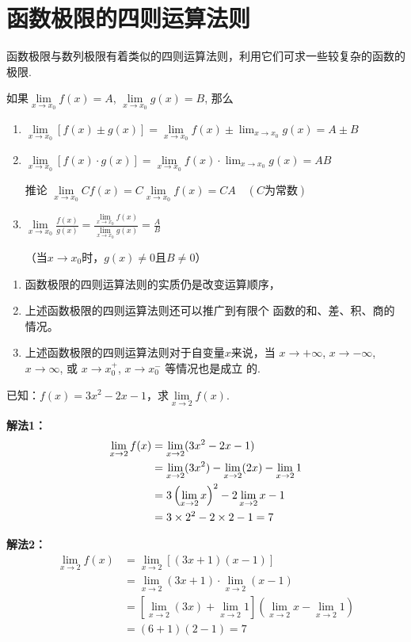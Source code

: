 \section{函数极限的四则运算法则}
函数极限与数列极限有着类似的四则运算法则，利用它们可求一些较复杂的函数的极限.

如果$\lim\limits_{x\to x_{0}}f(x)=A$, $\lim\limits_{x\to x_{0}}g(x)=B$, 那么
\begin{enumerate}
    \item $\lim\limits_{x\to x_{0}}[f(x)\pm g(x)]=\lim\limits_{x\to x_{0}}f(x)\pm\lim_{x\to x_{0}}g(x)=A\pm B$
    \item $\lim\limits_{x\to x_{0}}[f(x)\cdot g(x)]=\lim\limits_{x\to x_{0}}f(x)\cdot\lim_{x\to x_{0}}g(x)=A  B$
\begin{thm}
   {推论} $\lim\limits_{x\to x_{0}}Cf( x) = C\lim\limits _{x\to x_{0}}f( x) = CA\quad (C\text{为常数})$
\end{thm}
\item $\lim\limits_{x\to x_0}\frac{f(x)}{g(x)}=\frac{\lim\limits_{x\to x_0}f(x)}{\lim\limits_{x\to x_0}g(x)}=\frac{A}{B}$

（当$x\to x_0$时，$g(x)\ne 0$且$B\ne 0$）
\end{enumerate}

\begin{rmk}
\begin{enumerate}
    \item 函数极限的四则运算法则的实质仍是改变运算顺序，
    \item 上述函数极限的四则运算法则还可以推广到有限个
函数的和、差、积、商的情况。
\item 上述函数极限的四则运算法则对于自变量$x$来说，当
$x\to+\infty$, $x\to-\infty$, $x\to\infty$, 或 $x\to x_0^+$, $x\to x_0^-$ 等情况也是成立
的.
\end{enumerate}
\end{rmk}

\begin{example}
已知：$f(x)=3x^2-2x-1$，求$\lim\limits_{x\to 2}f(x)$.
\end{example}

\begin{solution}
    \textbf{解法1：}
\[\begin{split}
    \lim\limits_{x\to 2}f(x)&=\lim\limits_{x\to 2}(3x^2-2x-1)\\
&=\lim\limits_{x\to 2}(3x^2)-\lim\limits_{x\to 2}(2x)-\lim\limits_{x\to 2}1\\
&=3\left(\lim\limits_{x\to 2} x\right)^2 -2\lim\limits_{x\to 2} x-1\\
&=3\times 2^2-2\times 2-1 =7
\end{split} \]
    
\textbf{解法2：}
\[\begin{split}
    \lim\limits_{x\to 2}f(x)&=\lim\limits_{x\to 2}[(3x+1)(x-1)]\\
&=\lim\limits_{x\to 2}(3x+1)\cdot \lim\limits_{x\to 2}(x-1)\\
&=\left[\lim\limits_{x\to 2}(3x)+\lim\limits_{x\to 2}1\right]\left(\lim\limits_{x\to 2}x- \lim\limits_{x\to 2}1\right)\\
&=(6+1)(2-1)=7
\end{split} \]
\end{solution}


